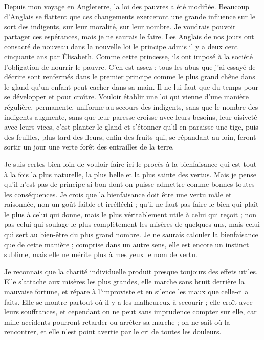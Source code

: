 \documentclass[french,twoside]{book} %
\begin{document}
Depuis mon voyage en Angleterre, la loi des pauvres a été modifiée. Beaucoup d’Anglais se flattent que ces changements exerceront une grande influence sur le sort des indigents, sur leur moralité, sur leur nombre. Je voudrais pouvoir partager ces espérances, mais je ne saurais le faire. Les Anglais de nos jours ont consacré de nouveau dans la nouvelle loi le principe admis il y a deux cent cinquante ans par Élisabeth. Comme cette princesse, ils ont imposé à la société l’obligation de nourrir le pauvre. C'en est assez ; tous les abus que j’ai essayé de décrire sont renfermés dans le premier principe comme le plus grand chêne dans le gland qu’un enfant peut cacher dans sa main. Il ne lui faut que du temps pour se développer et pour croître. Vouloir établir une loi qui vienne d’une manière régulière, permanente, uniforme au secours des indigents, sans que le nombre des indigents augmente, sans que leur paresse croisse avec leurs besoins, leur oisiveté avec leurs vices, c’est planter le gland et s’étonner qu’il en paraisse une tige, puis des feuilles, plus tard des fleurs, enfin des fruits qui, se répandant au loin, feront sortir un jour une verte forêt des entrailles de la terre.\par
Je suis certes bien loin de vouloir faire ici le procès à la bienfaisance qui est tout à la fois la plus naturelle, la plus belle et la plus sainte des vertus. Mais je pense qu’il n’est pas de principe si bon dont on puisse admettre comme bonnes toutes les conséquences. Je crois que la bienfaisance doit être une vertu mâle et raisonnée, non un goût faible et irréfléchi ; qu’il ne faut pas faire le bien qui plaît le plus à celui qui donne, mais le plus véritablement utile à celui qui reçoit ; non pas celui qui soulage le plus complètement les misères de quelques-uns, mais celui qui sert au bien-être du plus grand nombre. Je ne saurais calculer la bienfaisance que de cette manière ; comprise dans un autre sens, elle est encore un instinct sublime, mais elle ne mérite plus à mes yeux le nom de vertu.\par
Je reconnais que la charité individuelle produit presque toujours des effets utiles. Elle s’attache aux misères les plus grandes, elle marche sans bruit derrière la mauvaise fortune, et répare à l’improviste et en silence les maux que celle-ci a faits. Elle se montre partout où il y a les malheureux à secourir ; elle croît avec leurs souffrances, et cependant on ne peut sans imprudence compter sur elle, car mille accidents pourront retarder ou arrêter sa marche ; on ne sait où la rencontrer, et elle n’est point avertie par le cri de toutes les douleurs.\par
\end{document}
